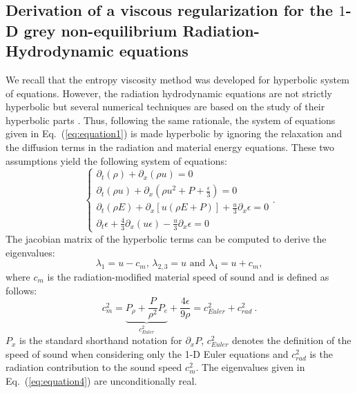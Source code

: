 \documentclass[review]{elsarticle}
\newcommand{\eqt}[1]{Eq.~(\ref{#1})}                     %
\begin{document}
\subsection{Derivation of a viscous regularization for the $1$-D grey non-equilibrium Radiation-Hydrodynamic equations}\label{sec:visc-reg}
We recall that the entropy viscosity method was developed for hyperbolic system of equations. However, the radiation hydrodynamic equations are not strictly hyperbolic but several numerical techniques are based on the study of their hyperbolic parts \cite{Balsara, LowrieMorel}. Thus, following the same rationale, the system of equations given in \eqt{eq:equation1} is made hyperbolic by ignoring the relaxation and the diffusion terms in the radiation and material energy equations. These two assumptions yield the following system of equations:
\begin{equation}
\label{eq:equation3}
\left\{
\begin{array}{lll}
\partial_t \left( \rho \right) + \partial_x\left( \rho u \right) = 0 \\
\partial_t \left( \rho u\right) + \partial_x \left(\rho u^2 + P + \frac{\epsilon}{3} \right) = 0 \\
\partial_t \left( \rho E\right) + \partial_x \left[ u \left( \rho E + P \right) \right] +\frac{u}{3} \partial_x \epsilon = 0\\
\partial_t \epsilon + \frac{4}{3} \partial_x \left( u \epsilon \right) - \frac{u}{3} \partial_x \epsilon = 0
\end{array}
\right. .
\end{equation}
The jacobian matrix of the hyperbolic terms can be computed to derive the eigenvalues:
\begin{equation}
\label{eq:equation4}
\lambda_1 = u-c_m \text{, } \lambda_{2,3} = u \text{ and } \lambda_4 = u+c_m ,
\end{equation}
where $c_m$ is the radiation-modified material speed of sound and is defined as follows:
\begin{equation}
\label{eq:equation5}
c_m^2 = \underbrace{P_{\rho} + \frac{P}{\rho^2}P_e}_{c_{Euler}^2} + \frac{4 \epsilon}{9\rho} = c_{Euler}^2 + c^2_{rad} \ .
\end{equation}
$P_x$ is the standard shorthand notation for $\partial_x P$, $c^2_{Euler}$ denotes the definition of the speed of sound when considering only the 1-D Euler equations and $c^2_{rad}$ is the radiation contribution to the sound speed $c_m^2$. The eigenvalues given in \eqt{eq:equation4} are unconditionally real.
\end{document}
